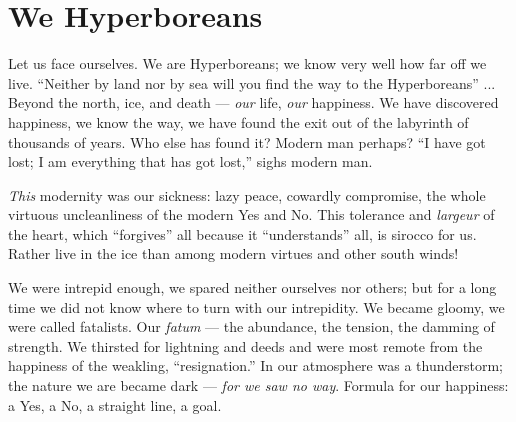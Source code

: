 \section{We Hyperboreans}

\begin{quotationx}
Let us face ourselves. We are Hyperboreans; we know very well how far off we live. ``Neither by land nor by sea will you find the way to the Hyperboreans'' ... Beyond the north, ice, and death --- \emph{our} life, \emph{our} happiness. We have discovered happiness, we know the way, we have found the exit out of the labyrinth of thousands of years. Who else has found it? Modern man perhaps? ``I have got lost; I am everything that has got lost,'' sighs modern man.

\emph{This} modernity was our sickness: lazy peace, cowardly compromise, the whole virtuous uncleanliness of the modern Yes and No. This tolerance and \emph{largeur} of the heart, which ``forgives'' all because it ``understands'' all, is sirocco for us. Rather live in the ice than among modern virtues and other south winds!

We were intrepid enough, we spared neither ourselves nor others; but for a long time we did not know where to turn with our intrepidity. We became gloomy, we were called fatalists. Our \emph{fatum} --- the abundance, the tension, the damming of strength. We thirsted for lightning and deeds and were most remote from the happiness of the weakling, ``resignation.'' In our atmosphere was a thunderstorm; the nature we are became dark --- \emph{for we saw no way}. Formula for our happiness: a Yes, a No, a straight line, a goal.


\end{quotationx}




